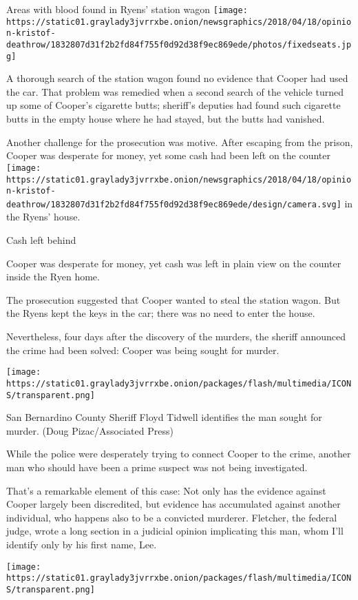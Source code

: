  Areas with blood found in Ryens' station wagon
\texttt{[image: https://static01.graylady3jvrrxbe.onion/newsgraphics/2018/04/18/opinion-kristof-deathrow/1832807d31f2b2fd84f755f0d92d38f9ec869ede/photos/fixedseats.jpg]}

A thorough search of the station wagon found no evidence that Cooper had
used the car. That problem was remedied when a second search of the
vehicle turned up some of Cooper's cigarette butts; sheriff's deputies
had found such cigarette butts in the empty house where he had stayed,
but the butts had vanished.

Another challenge for the prosecution was motive. After escaping from
the prison, Cooper was desperate for money, yet some cash had been left
on the counter
\texttt{[image: https://static01.graylady3jvrrxbe.onion/newsgraphics/2018/04/18/opinion-kristof-deathrow/1832807d31f2b2fd84f755f0d92d38f9ec869ede/design/camera.svg]}
in the Ryens' house.

Cash left behind

Cooper was desperate for money, yet cash was left in plain view on the
counter inside the Ryen home.

The prosecution suggested that Cooper wanted to steal the station wagon.
But the Ryens kept the keys in the car; there was no need to enter the
house.

Nevertheless, four days after the discovery of the murders, the sheriff
announced the crime had been solved: Cooper was being sought for murder.

\texttt{[image: https://static01.graylady3jvrrxbe.onion/packages/flash/multimedia/ICONS/transparent.png]}

San Bernardino County Sheriff Floyd Tidwell identifies the man sought
for murder. (Doug Pizac/Associated Press)

While the police were desperately trying to connect Cooper to the crime,
another man who should have been a prime suspect was not being
investigated.

That's a remarkable element of this case: Not only has the evidence
against Cooper largely been discredited, but evidence has accumulated
against another individual, who happens also to be a convicted murderer.
Fletcher, the federal judge, wrote a long section in a judicial opinion
implicating this man, whom I'll identify only by his first name, Lee.

\texttt{[image: https://static01.graylady3jvrrxbe.onion/packages/flash/multimedia/ICONS/transparent.png]}

